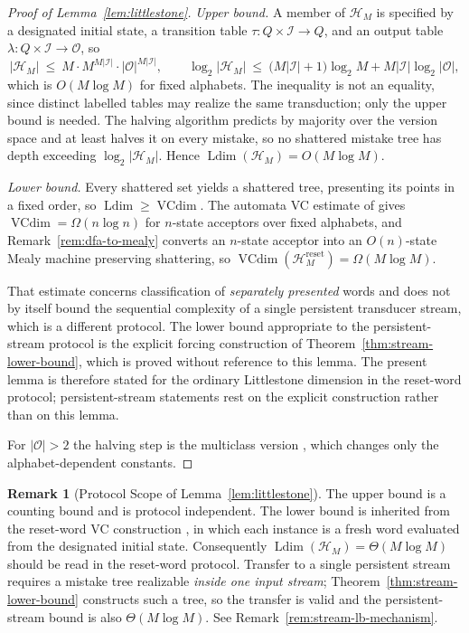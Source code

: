 \documentclass[12pt]{article}
\theoremstyle{definition}
\newtheorem{remark}[theorem]{Remark}
\DeclareMathOperator{\Ldim}{Ldim}
\begin{document}
\begin{proof}[Proof of Lemma~\ref{lem:littlestone}]
\emph{Upper bound.}  A member of $\mathcal H_M$ is specified by a designated
initial state, a transition table $\tau:Q\times\mathcal I\to Q$, and an output
table $\lambda:Q\times\mathcal I\to\mathcal O$, so
\[
|\mathcal H_M|
\ \le\
M\cdot M^{M|\mathcal I|}\cdot|\mathcal O|^{M|\mathcal I|},
\qquad
\log_2|\mathcal H_M|
\ \le\
\bigl(M|\mathcal I|+1\bigr)\log_2M+M|\mathcal I|\log_2|\mathcal O| ,
\]
which is $O(M\log M)$ for fixed alphabets.  The inequality is not an equality,
since distinct labelled tables may realize the same transduction; only the
upper bound is needed.  The halving algorithm predicts by
majority over the version space and at least halves it on every mistake, so no
shattered mistake tree has depth exceeding $\log_2|\mathcal H_M|$.  Hence
$\Ldim(\mathcal H_M)=O(M\log M)$.

\emph{Lower bound.}  Every shattered set yields a shattered tree, presenting
its points in a fixed order, so $\Ldim\ge\operatorname{VCdim}$.  The automata
VC estimate of \cite{ishigami1993} gives
$\operatorname{VCdim}=\Omega(n\log n)$ for $n$-state acceptors over fixed
alphabets, and Remark~\ref{rem:dfa-to-mealy} converts an $n$-state acceptor
into an $O(n)$-state Mealy machine preserving shattering, so
$\operatorname{VCdim}(\mathcal H_M^{\mathrm{reset}})=\Omega(M\log M)$.

That estimate concerns classification of \emph{separately presented} words and
does not by itself bound the sequential complexity of a single persistent
transducer stream, which is a different protocol.  The lower bound appropriate
to the persistent-stream protocol is the explicit forcing construction of
Theorem~\ref{thm:stream-lower-bound}, which is proved without reference to this
lemma.  The present lemma is therefore stated for the ordinary Littlestone
dimension in the reset-word protocol; persistent-stream statements rest on the
explicit construction rather than on this lemma.

For $|\mathcal O|>2$ the halving step is the multiclass version
\cite{daniely2014,cesabianchi2006}, which changes only the alphabet-dependent
constants.
\end{proof}

\begin{remark}[Protocol Scope of Lemma~\ref{lem:littlestone}]
\label{rem:ldim-protocol-scope}
The upper bound is a counting bound and is protocol independent.  The lower
bound is inherited from the reset-word VC construction
\cite{ishigami1993}, in which each instance is a fresh word evaluated from the
designated initial state.  Consequently $\Ldim(\mathcal H_M)=\Theta(M\log M)$
should be read in the reset-word protocol.  Transfer to a single persistent
stream requires a mistake tree realizable \emph{inside one input stream};
Theorem~\ref{thm:stream-lower-bound} constructs such a tree, so the transfer is
valid and the persistent-stream bound is also $\Theta(M\log M)$.  See
Remark~\ref{rem:stream-lb-mechanism}.
\end{remark}
\end{document}
